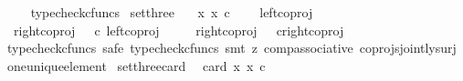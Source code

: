 \begin{isabellebody}
\ \ %
\endisadelimproof
%
\isatagproof
{}\isamarkupfalse%
\ typecheck{\isacharunderscore}{\kern0pt}cfuncs%
\endisatagproof
{\isafoldproof}%
%
\isadelimproof
\isanewline
%
\endisadelimproof
\isanewline
{}\isamarkupfalse%
\ set{\isacharunderscore}{\kern0pt}three{\isacharcolon}{\kern0pt}\ \isanewline
\ \ {\isachardoublequoteopen}{\isacharbraceleft}{\kern0pt}x{\isachardot}{\kern0pt}\ x\ {\isasymin}\isactrlsub c\ {\isacharparenleft}{\kern0pt}{\isasymone}{\isasymCoprod}{\isacharparenleft}{\kern0pt}{\isasymone}{\isasymCoprod}{\isasymone}{\isacharparenright}{\kern0pt}{\isacharparenright}{\kern0pt}{\isacharbraceright}{\kern0pt}\ {\isacharequal}{\kern0pt}\ {\isacharbraceleft}{\kern0pt}\isanewline
\ {\isacharparenleft}{\kern0pt}left{\isacharunderscore}{\kern0pt}coproj\ {\isasymone}\ {\isacharparenleft}{\kern0pt}{\isasymone}{\isasymCoprod}{\isasymone}{\isacharparenright}{\kern0pt}{\isacharparenright}{\kern0pt}\ {\isacharcomma}{\kern0pt}\ \isanewline
\ {\isacharparenleft}{\kern0pt}right{\isacharunderscore}{\kern0pt}coproj\ {\isasymone}\ {\isacharparenleft}{\kern0pt}{\isasymone}{\isasymCoprod}{\isasymone}{\isacharparenright}{\kern0pt}\ {\isasymcirc}\isactrlsub c\ left{\isacharunderscore}{\kern0pt}coproj\ {\isasymone}\ {\isasymone}{\isacharparenright}{\kern0pt}{\isacharcomma}{\kern0pt}\ \isanewline
\ \ right{\isacharunderscore}{\kern0pt}coproj\ {\isasymone}\ {\isacharparenleft}{\kern0pt}{\isasymone}{\isasymCoprod}{\isasymone}{\isacharparenright}{\kern0pt}\ {\isasymcirc}\isactrlsub c{\isacharparenleft}{\kern0pt}right{\isacharunderscore}{\kern0pt}coproj\ {\isasymone}\ {\isasymone}{\isacharparenright}{\kern0pt}{\isacharbraceright}{\kern0pt}{\isachardoublequoteclose}\isanewline
%
\isadelimproof
\ \ %
\endisadelimproof
%
\isatagproof
{}\isamarkupfalse%
{\isacharparenleft}{\kern0pt}typecheck{\isacharunderscore}{\kern0pt}cfuncs{\isacharcomma}{\kern0pt}\ safe{\isacharcomma}{\kern0pt}\ typecheck{\isacharunderscore}{\kern0pt}cfuncs{\isacharcomma}{\kern0pt}\ smt\ {\isacharparenleft}{\kern0pt}z{}{\isacharparenright}{\kern0pt}\ comp{\isacharunderscore}{\kern0pt}associative{}\ coprojs{\isacharunderscore}{\kern0pt}jointly{\isacharunderscore}{\kern0pt}surj\ one{\isacharunderscore}{\kern0pt}unique{\isacharunderscore}{\kern0pt}element{\isacharparenright}{\kern0pt}%
\endisatagproof
{\isafoldproof}%
%
\isadelimproof
\isanewline
%
\endisadelimproof
\isanewline
{}\isamarkupfalse%
\ set{\isacharunderscore}{\kern0pt}three{\isacharunderscore}{\kern0pt}card{\isacharcolon}{\kern0pt}\ \isanewline
\ {\isachardoublequoteopen}card\ {\isacharbraceleft}{\kern0pt}x{\isachardot}{\kern0pt}\ x\ {\isasymin}\isactrlsub c\ {\isacharparenleft}{\kern0pt}{\isasymone}{\isasymCoprod}{\isacharparenleft}{\kern0pt}{\isasymone}{\isasymCoprod}{\isasymone}{\isacharparenright}{\kern0pt}{\isacharparenright}{\kern0pt}{\isacharbraceright}{\kern0pt}\ {\isacharequal}{\kern0pt}\ {}{\isachardoublequoteclose}\isanewline

\end{isabellebody}
